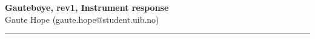 \documentclass[a4paper]{article}
\newcommand{\makeheading}[2]%
        {\hspace*{-\marginparsep minus \marginparwidth}%
         \begin{minipage}[t]{\textwidth\marginparwidth\marginparsep}%
           {\large \bfseries #1}\\{#2}\\[-0.15\baselineskip]%
                 \rule{\columnwidth}{1pt}%
         \end{minipage}}
\begin{document}
\makeheading{Gautebøye, rev1, Instrument response}{Gaute Hope
(gaute.hope@student.uib.no)}
\end{document}
